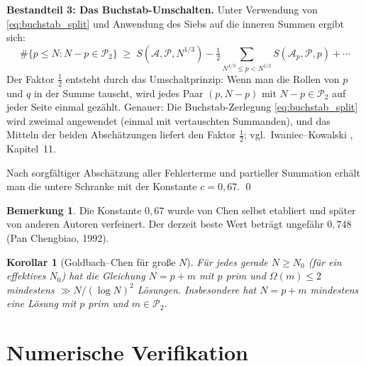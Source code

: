 \documentclass[12pt,a4paper]{amsart}
\newtheorem{korollar}[theorem]{Korollar}
\theoremstyle{definition}
\newtheorem{bemerkung}[theorem]{Bemerkung}
\newcommand{\Ptwo}{\mathcal{P}_2}
\newcommand{\OOmega}{\Omega}
\begin{document}
\textbf{Bestandteil 3: Das Buchstab-Umschalten.}
Unter Verwendung von \eqref{eq:buchstab_split} und Anwendung des Siebs
auf die inneren Summen ergibt sich:
\begin{equation}\label{eq:chen_schluessel}
  \#\{p \leq N : N-p \in \Ptwo\}
  \;\geq\;
  S(\mathcal{A}, \mathcal{P}, N^{1/3})
  - \tfrac{1}{2}\sum_{N^{1/3} \leq p < N^{1/2}} S(\mathcal{A}_p, \mathcal{P}, p) + \cdots
\end{equation}
Der Faktor $\tfrac{1}{2}$ entsteht durch das Umschaltprinzip: Wenn man die
Rollen von $p$ und $q$ in der Summe tauscht, wird jedes Paar $(p, N-p)$
mit $N-p \in \Ptwo$ auf jeder Seite einmal gezählt.  Genauer: Die
Buchstab-Zerlegung \eqref{eq:buchstab_split} wird zweimal angewendet (einmal
mit vertauschten Summanden), und das Mitteln der beiden Abschätzungen liefert
den Faktor $\tfrac{1}{2}$; vgl.\ Iwaniec--Kowalski \cite{IwaniecKowalski2004},
Kapitel~11.

Nach sorgfältiger Abschätzung aller Fehlerterme und partieller Summation
erhält man die untere Schranke mit der Konstante $c = 0{,}67$.  \qed

\begin{bemerkung}
  Die Konstante $0{,}67$ wurde von Chen \cite{Chen1973} selbst
  etabliert und später von anderen Autoren verfeinert.  Der derzeit
  beste Wert beträgt ungefähr $0{,}748$ (Pan Chengbiao, 1992).
\end{bemerkung}

\begin{korollar}[Goldbach--Chen für große $N$]\label{kor:goldbach_chen}
  Für jedes gerade $N \geq N_0$ (für ein effektives $N_0$) hat die Gleichung
  $N = p + m$ mit $p$ prim und $\OOmega(m) \leq 2$ mindestens
  $\gg N/(\log N)^2$ Lösungen.  Insbesondere hat $N = p + m$ mindestens
  eine Lösung mit $p$ prim und $m \in \Ptwo$.
\end{korollar}

\section{Numerische Verifikation}
\end{document}
